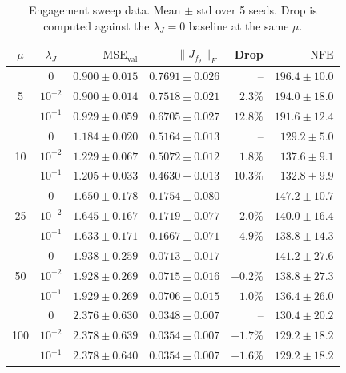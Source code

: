 \documentclass[11pt]{article}
\theoremstyle{plain}
\theoremstyle{definition}
\newcommand{\fjac}{J_{f_\theta}}
\newcommand{\NFE}{\mathrm{NFE}}
\begin{document}
\begin{table}[t]
\centering
\small
\caption{Engagement sweep data. Mean $\pm$ std over 5 seeds. Drop is computed
  against the $\lambda_J=0$ baseline at the same $\mu$.}
\label{tab:engagement}
\begin{tabular}{c c r r r r}
\toprule
$\mu$ & $\lambda_J$ & $\mathrm{MSE}_\text{val}$ & $\|\fjac\|_F$ & Drop & $\NFE$ \\
\midrule
\multirow{3}{*}{5}  & 0          & $0.900 \pm 0.015$ & $0.7691 \pm 0.026$ & --        & $196.4 \pm 10.0$ \\
                    & $10^{-2}$ & $0.900 \pm 0.014$ & $0.7518 \pm 0.021$ & $2.3\%$   & $194.0 \pm 18.0$ \\
                    & $10^{-1}$ & $0.929 \pm 0.059$ & $0.6705 \pm 0.027$ & $\mathbf{12.8\%}$ & $191.6 \pm 12.4$ \\
\midrule
\multirow{3}{*}{10} & 0          & $1.184 \pm 0.020$ & $0.5164 \pm 0.013$ & --        & $129.2 \pm 5.0$ \\
                    & $10^{-2}$ & $1.229 \pm 0.067$ & $0.5072 \pm 0.012$ & $1.8\%$   & $137.6 \pm 9.1$ \\
                    & $10^{-1}$ & $1.205 \pm 0.033$ & $0.4630 \pm 0.013$ & $\mathbf{10.3\%}$ & $132.8 \pm 9.9$ \\
\midrule
\multirow{3}{*}{25} & 0          & $1.650 \pm 0.178$ & $0.1754 \pm 0.080$ & --        & $147.2 \pm 10.7$ \\
                    & $10^{-2}$ & $1.645 \pm 0.167$ & $0.1719 \pm 0.077$ & $2.0\%$   & $140.0 \pm 16.4$ \\
                    & $10^{-1}$ & $1.633 \pm 0.171$ & $0.1667 \pm 0.071$ & $\mathbf{4.9\%}$ & $138.8 \pm 14.3$ \\
\midrule
\multirow{3}{*}{50} & 0          & $1.938 \pm 0.259$ & $0.0713 \pm 0.017$ & --        & $141.2 \pm 27.6$ \\
                    & $10^{-2}$ & $1.928 \pm 0.269$ & $0.0715 \pm 0.016$ & $-0.2\%$  & $138.8 \pm 27.3$ \\
                    & $10^{-1}$ & $1.929 \pm 0.269$ & $0.0706 \pm 0.015$ & $\mathbf{1.0\%}$ & $136.4 \pm 26.0$ \\
\midrule
\multirow{3}{*}{100} & 0         & $2.376 \pm 0.630$ & $0.0348 \pm 0.007$ & --        & $130.4 \pm 20.2$ \\
                     & $10^{-2}$ & $2.378 \pm 0.639$ & $0.0354 \pm 0.007$ & $-1.7\%$  & $129.2 \pm 18.2$ \\
                     & $10^{-1}$ & $2.378 \pm 0.640$ & $0.0354 \pm 0.007$ & $\mathbf{-1.6\%}$ & $129.2 \pm 18.2$ \\
\bottomrule
\end{tabular}
\end{table}
\end{document}
